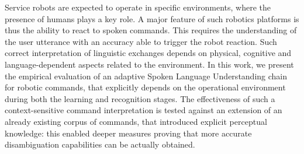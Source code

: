 Service robots are expected to operate in specific environments, where the presence of humans plays a key role. A major feature of such robotics platforms is thus the ability to react to spoken commands. This requires the understanding of the user utterance with an accuracy able to trigger the robot reaction. Such correct interpretation of linguistic exchanges depends on physical, cognitive and language-dependent aspects related to the environment. In this work, we present the empirical evaluation of an adaptive Spoken Language Understanding chain for robotic commands, that explicitly depends on the operational environment during both the learning and recognition stages. The effectiveness of such a context-sensitive command interpretation is tested against an extension of an already existing corpus of commands, that introduced explicit perceptual knowledge: this enabled deeper measures proving that more accurate disambiguation capabilities can be actually obtained.
